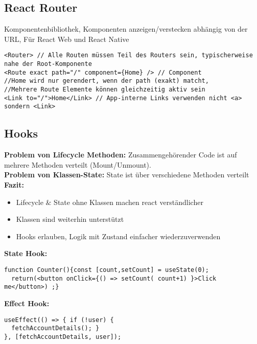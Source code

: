 \subsection{React Router}
Komponentenbibliothek, Komponenten anzeigen/verstecken abhängig von der URL, Für React Web und React Native
\begin{lstlisting}[style=htmlcssjs]
<Router> // Alle Routen müssen Teil des Routers sein, typischerweise nahe der Root-Komponente
<Route exact path="/" component={Home} /> // Component
//Home wird nur gerendert, wenn der path (exakt) matcht,
//Mehrere Route Elemente können gleichzeitig aktiv sein
<Link to="/">Home</Link> // App-interne Links verwenden nicht <a> sondern <Link>
\end{lstlisting}
\subsection{Hooks}
\textbf{Problem von Lifecycle Methoden:} Zusammengehörender Code ist auf mehrere Methoden verteilt (Mount/Unmount).\\
\textbf{Problem von Klassen-State:} State ist über verschiedene Methoden verteilt\\
\textbf{Fazit:}
\begin{itemize}[topsep=0pt, leftmargin=3mm]
  \setlength\itemsep{-0.3em}
  \item Lifecycle $\&$ State ohne Klassen machen react verständlicher
  \item Klassen sind weiterhin unterstützt
  \item Hooks erlauben, Logik mit Zustand einfacher wiederzuverwenden
\end{itemize}
\textcolor{b}{\textbf{State Hook:}}
\begin{lstlisting}[style=htmlcssjs]
function Counter(){const [count,setCount] = useState(0);
  return(<button onClick={() => setCount( count+1) }>Click me</button>) ;}
\end{lstlisting}
\textcolor{b}{\textbf{Effect Hook:}}
\begin{lstlisting}[style=htmlcssjs]
useEffect(() => { if (!user) {
  fetchAccountDetails(); }
}, [fetchAccountDetails, user]);
\end{lstlisting}
